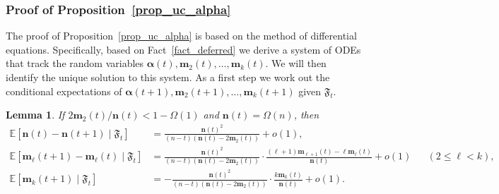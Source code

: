 \documentclass[10pt,reqno]{amsart}
\numberwithin{equation}{section}
\renewcommand{\vec}[1]{\boldsymbol{#1}}
\newcommand\fF{\mathfrak F}
\newcommand\vm{\vec m}
\newcommand\vn{\vec n}
\newcommand\Erw{\mathbb{E}}
\newcommand\ex{\Erw}
\newcommand\brk[1]{\left\lbrack{#1}\right\rbrack}
\newcommand\Prop{Proposition}
\newtheorem{lemma}[definition]{Lemma}
\begin{document}
\subsubsection{Proof of \Prop~\ref{prop_uc_alpha}}\label{sec_prop_uc_alpha}

The proof of \Prop~\ref{prop_uc_alpha} is based on the method of differential equations.
Specifically, based on Fact~\ref{fact_deferred} we derive a system of ODEs that track the random variables $\vec\alpha(t),\vm_2(t),\ldots,\vm_k(t)$.
We will then identify the unique solution to this system.
As a first step we work out the conditional expectations of $\vec\alpha(t+1),\vm_2(t+1),\ldots,\vm_k(t+1)$ given $\fF_t$.

\begin{lemma}\label{lem_condex}
	If $2\vm_2(t)/\vn(t)<1-\Omega(1)$ and $\vn(t)=\Omega(n)$, then 
	\begin{align}\label{eq_lem_condex_1}
		\ex\brk{\vn(t)-\vn(t+1)\mid\fF_t}&=\frac{\vn(t)^2}{(n-t)(\vn(t)-2\vm_2(t))}+o(1),\\
		\ex\brk{\vec m_\ell(t+1)-\vec m_\ell(t)\mid\fF_t}&=\frac{\vn(t)^2}{(n-t)(\vn(t)-2\vm_2(t))}\cdot\frac{(\ell+1)\vm_{\ell+1}(t)-\ell\vm_\ell(t)}{\vn(t)}+o(1)&&(2\leq\ell< k),\label{eq_lem_condex_2}\\
		\ex\brk{\vec m_k(t+1)\mid\fF_t}&=-\frac{\vn(t)^2}{(n-t)(\vn(t)-2\vm_2(t))}\cdot\frac{k\vm_k(t)}{\vn(t)}+o(1).\label{eq_lem_condex_3}
	\end{align}
\end{lemma}
\end{document}
